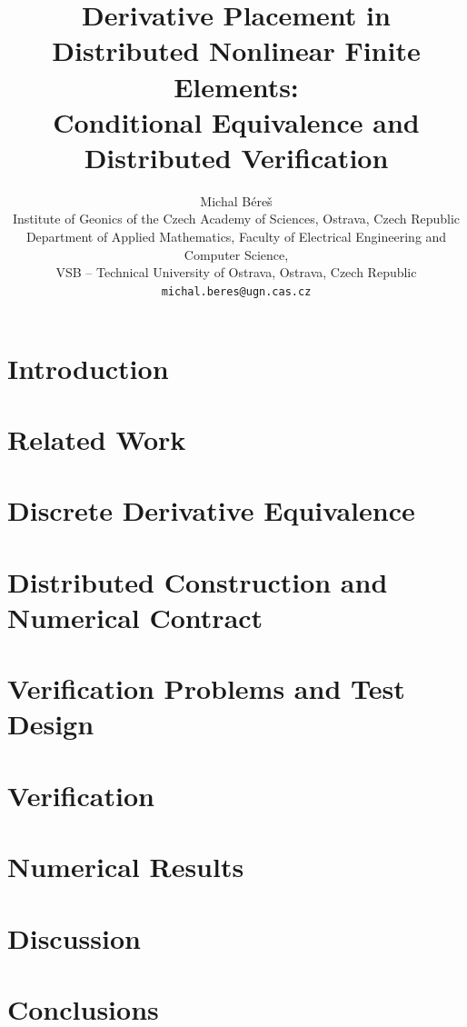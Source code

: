 \documentclass[10pt,a4paper]{article}
\title{Derivative Placement in Distributed Nonlinear Finite Elements:\\
\large Conditional Equivalence and Distributed Verification}
\author{
Michal B{\'e}re{\v{s}}\\
\small Institute of Geonics of the Czech Academy of Sciences, Ostrava, Czech Republic\\
\small Department of Applied Mathematics, Faculty of Electrical Engineering and Computer Science,\\
\small VSB -- Technical University of Ostrava, Ostrava, Czech Republic\\
\small \texttt{michal.beres@ugn.cas.cz}
}
\date{}
\begin{document}
\maketitle


\section{Introduction}

\FloatBarrier

\section{Related Work}


\section{Discrete Derivative Equivalence}


\section{Distributed Construction and Numerical Contract}


\section{Verification Problems and Test Design}


\section{Verification}


\section{Numerical Results}


\FloatBarrier

\section{Discussion}


\section{Conclusions}

\end{document}
